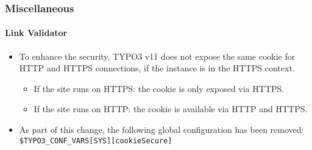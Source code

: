 %

\begin{frame}[fragile]
	\frametitle{Miscellaneous}
	\framesubtitle{Link Validator}

	\begin{itemize}
		\item To enhance the security, TYPO3 v11 does not expose the same cookie
			for HTTP and HTTPS connections, if the instance is in the HTTPS context.

			\begin{itemize}
				\item If the site runs on HTTPS: the cookie is only exposed via HTTPS.
				\item If the site runs on HTTP: the cookie is available via HTTP and HTTPS.
			\end{itemize}

		\item As part of this change, the following global configuration has been removed:
		 	\smaller\texttt{\$TYPO3\_CONF\_VARS[SYS][cookieSecure]}\normalsize

	\end{itemize}

\end{frame}

